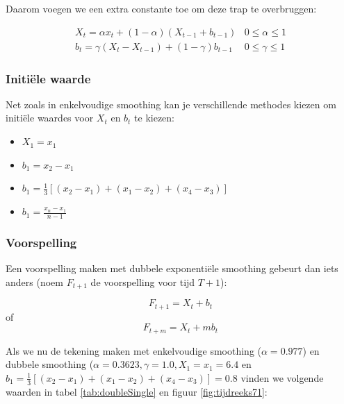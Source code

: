 Daarom voegen we een extra constante toe om deze trap te overbruggen:

\begin{definition}
\begin{eqnarray}
	X_{t} = \alpha x_{t} + (1-\alpha)(X_{t-1} + b_{t-1}) & 0 \leq \alpha \leq 1 \\
	b_{t} = \gamma(X_{t}-X_{t-1}) + (1-\gamma)b_{t-1} & 0 \leq \gamma \leq 1 
\label{eq:doubleSmoothing}
\end{eqnarray}
\end{definition}

\subsubsection{Initi\"ele waarde}
Net zoals in enkelvoudige smoothing kan je verschillende methodes kiezen om initi\"ele waardes voor $X_{t}$ en $b_{t}$ te kiezen:
\begin{itemize}
	\item $X_{1} = x_{1}$
	\item $b_{1} = x_{2} - x_{1}$
	\item $b_{1} = \frac{1}{3}\left[ (x_{2} - x_{1}) + (x_{1} - x_{2}) + (x_{4} - x_{3}) \right]$
	\item $b_{1} = \frac{x_{n} - x_{1}}{n-1}$
\end{itemize}

\subsubsection{Voorspelling}
Een voorspelling maken met dubbele exponenti\"ele smoothing gebeurt dan iets anders (noem $F_{t+1}$ de voorspelling voor tijd $T+1$):

\[ F_{t+1} = X_{t} + b_{t} \]
of
\[ F_{t+m} = X_{t} + m b_{t} \]

Als we nu de tekening maken met enkelvoudige smoothing ($\alpha = 0.977$) en dubbele smoothing ($\alpha = 0.3623, \gamma = 1.0, X_{1} = x_{1} = 6.4$ en $b_{1} = \frac{1}{3}\left[ (x_{2} - x_{1}) + (x_{1} - x_{2}) + (x_{4} - x_{3}) \right] = 0.8$ vinden we volgende waarden in tabel \ref{tab:doubleSingle} en figuur \ref{fig:tijdreeks71}:

